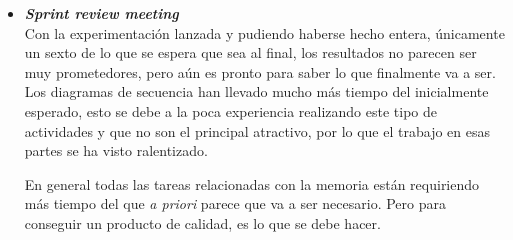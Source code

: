 \begin{itemize}
\item \textbf{\textit{Sprint review meeting}}\\
Con la experimentación lanzada y pudiendo haberse hecho entera, únicamente un sexto de lo que se espera que sea al final, los resultados no parecen ser muy prometedores, pero aún es pronto para saber lo que finalmente va a ser.\\

Los diagramas de secuencia han llevado mucho más tiempo del inicialmente esperado, esto se debe a la poca experiencia realizando este tipo de actividades y que no son el principal atractivo, por lo que el trabajo en esas partes se ha visto ralentizado.

En general todas las tareas relacionadas con la memoria están requiriendo más tiempo del que \textit{a priori} parece que va a ser necesario. Pero para conseguir un producto de calidad, es lo que se debe hacer.

\end{itemize}

